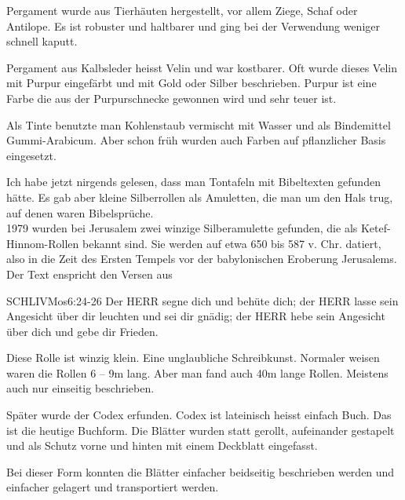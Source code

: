\documentclass[fontsize=16pt]{mybib}
\begin{document}
\begin{otsblock}
    Pergament wurde aus Tierhäuten hergestellt, vor allem Ziege, Schaf oder Antilope. Es ist robuster und haltbarer und ging bei der Verwendung weniger schnell kaputt.

    Pergament aus Kalbsleder heisst Velin und war kostbarer. Oft wurde dieses Velin mit Purpur eingefärbt und mit Gold oder Silber beschrieben. Purpur ist eine Farbe die aus der Purpurschnecke gewonnen wird und sehr teuer ist.

    Als Tinte benutzte man Kohlenstaub vermischt mit Wasser und als Bindemittel Gummi-Arabicum. Aber schon früh wurden auch Farben auf pflanzlicher Basis eingesetzt.
\end{otsblock}
\begin{otsblock}
    Ich habe jetzt nirgends gelesen, dass man Tontafeln mit Bibeltexten gefunden hätte. Es gab aber kleine Silberrollen als Amuletten, die man um den Hals trug, auf denen waren Bibelsprüche.\\
    1979 wurden bei Jerusalem zwei winzige Silberamulette gefunden, die als Ketef-Hinnom-Rollen bekannt sind. Sie werden auf etwa 650 bis 587 v. Chr. datiert, also in die Zeit des Ersten Tempels vor der babylonischen Eroberung Jerusalems.\\
    Der Text enspricht den Versen aus 
    \begin{bibelbox}{SCHL}{IVMos}{6:24-26}
        Der HERR segne dich und behüte dich;
        der HERR lasse sein Angesicht über dir leuchten und sei dir gnädig;
        der HERR hebe sein Angesicht über dich und gebe dir Frieden.
    \end{bibelbox}
    Diese Rolle ist winzig klein. Eine unglaubliche Schreibkunst. Normaler weisen waren die Rollen  6 -- 9m lang. Aber man fand auch 40m lange Rollen. Meistens auch nur einseitig beschrieben.

    Später wurde der Codex erfunden. Codex ist lateinisch heisst einfach Buch. Das ist die heutige Buchform. Die Blätter wurden statt gerollt, aufeinander gestapelt und als Schutz vorne und hinten mit einem Deckblatt eingefasst.

    Bei dieser Form konnten die Blätter einfacher beidseitig beschrieben werden und einfacher gelagert und transportiert werden.
\end{otsblock}
\end{document}
